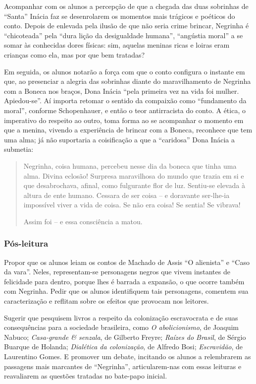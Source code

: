 \documentclass[11pt]{extarticle}
\begin{document}
Acompanhar com os alunos a percepção de que a chegada das duas sobrinhas
de ``Santa'' Inácia faz se desenrolarem os momentos mais trágicos e
poéticos do conto. Depois de enlevada pela ilusão de que não seria crime
brincar, Negrinha é ``chicoteada'' pela ``dura lição da desigualdade
humana'', ``angústia moral'' a se somar às conhecidas dores físicas:
sim, aquelas meninas ricas e loiras eram crianças como ela, mas por que
bem tratadas?

Em seguida, os alunos notarão a força com que o conto configura o
instante em que, ao presenciar a alegria das sobrinhas diante do
maravilhamento de Negrinha com a Boneca nos braços, Dona Inácia ``pela
primeira vez na vida foi mulher. Apiedou-se''. Aí importa retomar o
sentido da compaixão como ``fundamento da moral'', conforme
Schopenhauer, e então o teor antirracista do conto. A ética, o
imperativo do respeito ao outro, toma forma ao se acompanhar o momento
em que a menina, vivendo a experiência de brincar com a Boneca,
reconhece que tem uma alma; já não suportaria a coisificação a que a
``caridosa'' Dona Inácia a submetia:

\begin{quote}
Negrinha, coisa humana, percebeu nesse dia da boneca que tinha uma alma.
Divina eclosão! Surpresa maravilhosa do mundo que trazia em si e que
desabrochava, afinal, como fulgurante flor de luz. Sentiu-se elevada à
altura de ente humano. Cessara de ser coisa -- e doravante ser-lhe-ia
impossível viver a vida de coisa. Se não era coisa! Se sentia! Se
vibrava!

Assim foi -- e essa consciência a matou.
\end{quote}

\subsubsection{Pós-leitura}

Propor que os alunos leiam os contos de Machado de Assis ``O alienista''
e ``Caso da vara''. Neles, representam-se personagens negros que vivem
instantes de felicidade para dentro, porque lhes é barrada a expansão, o
que ocorre também com Negrinha. Pedir que os alunos identifiquem tais
personagens, comentem sua caracterização e reflitam sobre os efeitos que
provocam nos leitores.

Sugerir que pesquisem livros a respeito da colonização escravocrata e de
suas consequências para a sociedade brasileira, como \emph{O
abolicionismo}, de Joaquim Nabuco; \emph{Casa-grande \& senzala}, de
Gilberto Freyre; \emph{Raízes do Brasil}, de Sérgio Buarque de Holanda;
\emph{Dialética da colonização}, de Alfredo Bosi; \emph{Escravidão}, de
Laurentino Gomes. E promover um debate, incitando os alunos a
relembrarem as passagens mais marcantes de ``Negrinha'', articularem-nas
com essas leituras e reavaliarem as questões tratadas no bate-papo
inicial.
\end{document}
